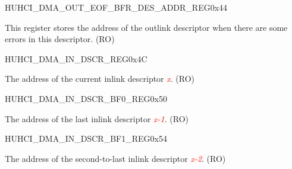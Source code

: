 \begin{register}{H}{UHCI\_DMA\_OUT\_EOF\_BFR\_DES\_ADDR\_REG}{0x44}\label{regdesc:UHCIDMAOUTEOFBFRDESADDRREG}
%
\regnewline%
\begin{regdesc}\begin{reglist}
\item [UHCI\_DMA\_OUT\_EOF\_BFR\_DES\_ADDR\_REG]This register stores the address of the outlink descriptor when there are some errors in this descriptor. (RO)
\end{reglist}\end{regdesc}
\end{register}


\begin{register}{H}{UHCI\_DMA\_IN\_DSCR\_REG}{0x4C}\label{regdesc:UHCIDMAINDSCRREG}
%
\regnewline%
\begin{regdesc}\begin{reglist}
\item [UHCI\_DMA\_IN\_DSCR\_REG]The address of the current inlink descriptor \textcolor{red}{\it{x}}. (RO)
\end{reglist}\end{regdesc}
\end{register}


\begin{register}{H}{UHCI\_DMA\_IN\_DSCR\_BF0\_REG}{0x50}\label{regdesc:UHCIDMAINDSCRBF0REG}
%
\regnewline%
\begin{regdesc}\begin{reglist}
\item [UHCI\_DMA\_IN\_DSCR\_BF0\_REG]The address of the last inlink descriptor \textcolor{red}{\it{x-1}}. (RO)
\end{reglist}\end{regdesc}
\end{register}


\begin{register}{H}{UHCI\_DMA\_IN\_DSCR\_BF1\_REG}{0x54}\label{regdesc:UHCIDMAINDSCRBF1REG}
%
\regnewline%
\begin{regdesc}\begin{reglist}
\item [UHCI\_DMA\_IN\_DSCR\_BF1\_REG]The address of the second-to-last inlink descriptor \textcolor{red}{\it{x-2}}. (RO)
\end{reglist}\end{regdesc}
\end{register}


